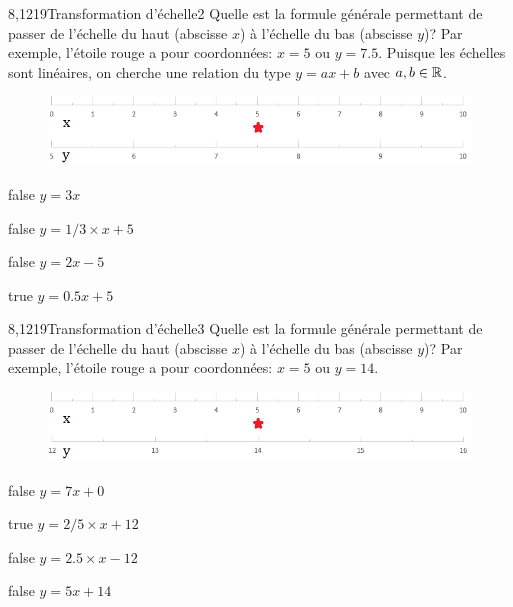 \documentclass[11pt]{article}
\begin{document}
			\begin{question}{8,1219}{Transformation d'échelle}{2}{}
				Quelle est la formule générale permettant de passer de l'échelle du haut (abscisse $x$) à l'échelle du bas (abscisse $y$)? Par exemple, l'étoile rouge a pour coordonnées: $x=5$ ou $y=\num{7.5}$. Puisque les échelles sont linéaires, on cherche une relation du type $y = ax+b$ avec $a,b\in\mathbb {R} $.
				\begin{figure}
					\centering
					\includegraphics[scale=.75]{Antoine/Figures_Antoine/lin_0_10_to_lin_5_10_star_5_7d5.png}
				\end{figure}
			\end{question}
			\begin{reponses}
				\item[false] $y = 3x$
					\item[false] $y = 1/3\times x+5$
					\item[false] $y = 2 x-5$
					\item[true] $y = \num{0.5}x + 5$
			\end{reponses}
			
			\begin{question}{8,1219}{Transformation d'échelle}{3}{}
				Quelle est la formule générale permettant de passer de l'échelle du haut (abscisse $x$) à l'échelle du bas (abscisse $y$)? Par exemple, l'étoile rouge a pour coordonnées: $x=5$ ou $y=\num{14}$.
				\begin{figure}
					\centering
    	            \includegraphics[scale=.75]{Antoine/Figures_Antoine/lin_0_10_to_lin_12_16_star_5_14.png}
				\end{figure}
			\end{question}
			\begin{reponses}
				\item[false] $y = 7x+0$
				\item[true] $y = 2/5\times x+12$
				\item[false] $y = \num{2.5}\times x-12$
				\item[false] $y = \num{5}x + 14$
			\end{reponses}
			
\end{document}
